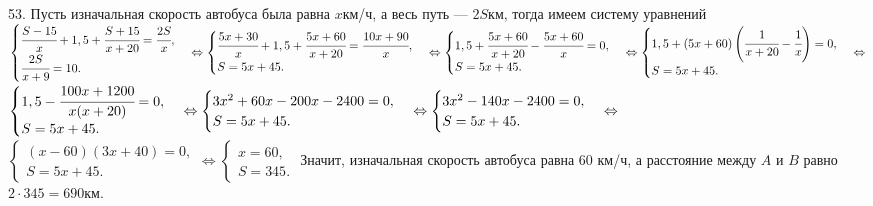 53. Пусть изначальная скорость автобуса была равна $x$км/ч, а весь путь --- $2S$км, тогда имеем систему уравнений
$\begin{cases}\cfrac{S-15}{x}+1,5+\cfrac{S+15}{x+20}=\cfrac{2S}{x},\\ \cfrac{2S}{x+9}=10.\end{cases}\Leftrightarrow
\begin{cases}\cfrac{5x+30}{x}+1,5+\cfrac{5x+60}{x+20}=\cfrac{10x+90}{x},\\ S=5x+45.\end{cases}\Leftrightarrow
\begin{cases}1,5+\cfrac{5x+60}{x+20}-\cfrac{5x+60}{x}=0,\\ S=5x+45.\end{cases}\Leftrightarrow
\begin{cases}1,5+(5x+60)\left(\cfrac{1}{x+20}-\cfrac{1}{x}\right)=0,\\ S=5x+45.\end{cases}\Leftrightarrow$\\$
\begin{cases}1,5-\cfrac{100x+1200}{x(x+20)}=0,\\ S=5x+45.\end{cases}\Leftrightarrow
\begin{cases}3x^2+60x-200x-2400=0,\\ S=5x+45.\end{cases}\Leftrightarrow
\begin{cases}3x^2-140x-2400=0,\\ S=5x+45.\end{cases}\Leftrightarrow$\\$
\begin{cases}(x-60)(3x+40)=0,\\ S=5x+45.\end{cases}\Leftrightarrow
\begin{cases}x=60,\\ S=345.\end{cases}$
Значит, изначальная скорость автобуса равна 60 км/ч, а расстояние между $A$ и $B$ равно $2\cdot345=690$км.\\
